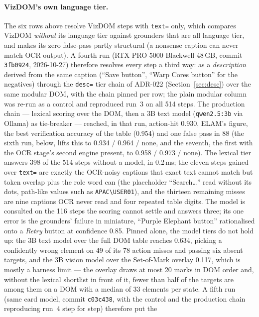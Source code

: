 \documentclass[11pt,a4paper]{article}
\newcommand{\code}[1]{\texttt{#1}}
\begin{document}
\paragraph{VizDOM's own language tier.} The six rows above resolve VizDOM steps with
\code{text=} only, which compares VizDOM \emph{without} its language tier against
grounders that are all language tier, and makes its zero false-pass partly structural
(a nonsense caption can never match OCR output). A fourth run (RTX PRO 5000 Blackwell
48\,GB, commit \code{3fb0924}, 2026-10-27) therefore resolves every step a third way:
as a \emph{description} derived from the same caption (``Save button'', ``Warp Cores
button'' for the negatives) through the \code{desc=} tier chain of ADR-022
(Section~\ref{sec:desc}) over the same modular DOM, with the chain pinned per row; the
plain modular column was re-run as a control and reproduced run~3 on all 514 steps.
The production chain --- lexical scoring over the DOM, then a 3B text model
(\code{qwen2.5:3b} via Ollama) as tie-breaker --- reached, in that run, action-hit
0.930, ELAM's figure, the best verification accuracy of the table (0.954) and one
false pass in 88 (the sixth run, below, lifts this to 0.934 / 0.964 / none, and the
seventh, the first with the OCR stage's second engine present, to 0.958 / 0.973 / none).
The lexical tier answers 398 of the 514 steps without a model, in 0.2\,ms; the eleven
steps gained over \code{text=} are exactly the OCR-noisy captions that exact text
cannot match but token overlap plus the role word can (the placeholder
``Search\ldots'' read without its dots, path-like values such as
\code{APAC\textbackslash USER01}), and the thirteen remaining misses are nine captions
OCR never read and four repeated table digits. The model is consulted on the 116
steps the scoring cannot settle and answers three; its one error is the grounders'
failure in miniature, ``Purple Elephant button'' rationalised onto a \emph{Retry}
button at confidence 0.85. Pinned alone, the model tiers do not hold up: the 3B text
model over the full DOM table reaches 0.634, picking a confidently wrong element on
49 of its 78 action misses and passing six absent targets, and the 3B vision model
over the Set-of-Mark overlay 0.117, which is mostly a harness limit --- the overlay
draws at most 20 marks in DOM order and, without the lexical shortlist in front of
it, fewer than half of the targets are among them on a DOM with a median of 33
elements per state. A fifth run (same card model, commit \code{c03c438}, with the
control and the production chain reproducing run~4 step for step) therefore put the
\end{document}
